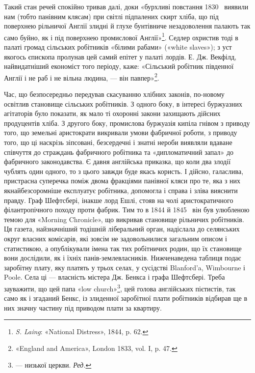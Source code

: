 Такий стан речей спокійно тривав далі, доки «бурхливі повстання
1830~ виявили нам (тобто панівним клясам) при світлі
підпалених скирт хліба, що під поверхнею рільничої Англії
злидні й глухе бунтівниче незадоволення палають так само буйно,
як і під поверхнею промислової Англії»\footnote{
\emph{S. Laing}: «National Distress», 1844, p. 62.
}. Седлер охристив тоді
в палаті громад сільських робітників «білими рабами» («white
slaves»); з уст якогось єпископа пролунав цей самий епітет у палаті
лордів. Е. Дж. Векфілд, найвидатніший економіст того періоду,
каже: «Сільський робітник південної Англії і не раб
і не вільна людина, — він павпер»\footnote{
«England and America», London 1833, vol. I, p. 47.
}.

Час, що безпосередньо передував скасуванню хлібних законів,
по-новому освітлив становище сільських робітників. З одного
боку, в інтересі буржуазних агітаторів було показати, як
мало ті охоронні закони захищають дійсних продуцентів хліба.
З другого боку, промислова буржуазія кипіла гнівом з приводу
того, що земельні аристократи викривали умови фабричної роботи,
з приводу того, що ці наскрізь зіпсовані, безсердечні і
знатні нероби виявляли вдаване співчуття до страждань фабричного
робітника та «дипломатичний запал» до фабричного законодавства.
Є давня англійська приказка, що коли два злодії
чублять один одного, то з цього завжди буде якась користь.
І дійсно, галаслива, пристрасна суперечка поміж двома фракціями
панівної кляси про те, яка з них якнайбезсоромніше експлуатує
робітника, допомогла і справа і зліва вияснити правду. Граф
Шефтсбері, інакше лорд Ешлі, стояв на чолі аристократичного
філантропічного походу проти фабрик. Тим то в 1844 й
1845~ він був улюбленою темою для «Morning Chronicle», що
викривав становище рільничих робітників. Ця газета, найзначніший
тодішній ліберальний орган, надіслала до селянських округ
власних комісарів, які зовсім не задовольнилися загальним
описом і статистикою, а опублікували імена так тих робітничих
родин, що їх становище вони дослідили, як і їхніх панів-землевласників.
Нижченаведена таблиця подає заробітну плату,
яку платять у трьох селах, у сусідстві Blanford’a, Wimbourne
і Poole. Села ці — власність містера Дж. Бенкса і графа Шефтсбері.
Треба зауважити, що цей папа «low church»\footnote*{
— низької церкви. \emph{Ред.}
}, цей голова англійських
пієтистів, так само як і згаданий Бенкс, із злиденної
заробітної плати робітників відбирав ще в них значну частину
під приводом плати за квартиру.

